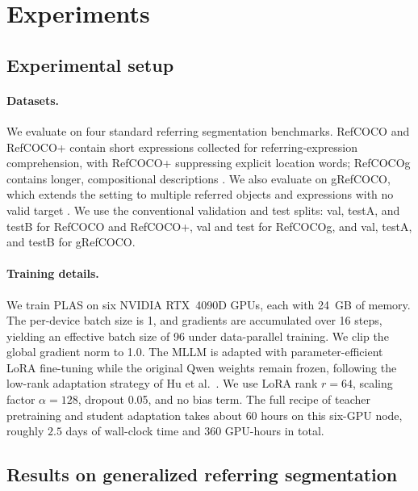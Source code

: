 \section{Experiments}
\label{sec:experiments}

\newcommand{\best}[1]{\textbf{#1}}
\newcommand{\second}[1]{\underline{#1}}

\subsection{Experimental setup}
\label{sec:exp_setup}

\paragraph{Datasets.}
We evaluate on four standard referring segmentation benchmarks. RefCOCO and RefCOCO+ contain short expressions collected for referring-expression comprehension, with RefCOCO+ suppressing explicit location words; RefCOCOg contains longer, compositional descriptions \cite{Yu2016ModelingContext,Mao2016RefCOCOg}. We also evaluate on gRefCOCO, which extends the setting to multiple referred objects and expressions with no valid target \cite{Liu2023GRES}. We use the conventional validation and test splits: val, testA, and testB for RefCOCO and RefCOCO+, val and test for RefCOCOg, and val, testA, and testB for gRefCOCO.


\paragraph{Training details.}
We train PLAS on six NVIDIA RTX~4090D GPUs, each with 24~GB of memory. The per-device batch size is 1, and gradients are accumulated over 16 steps, yielding an effective batch size of 96 under data-parallel training. We clip the global gradient norm to 1.0. The MLLM is adapted with parameter-efficient LoRA fine-tuning while the original Qwen weights remain frozen, following the low-rank adaptation strategy of Hu et al.~\cite{Hu2022LoRA}. We use LoRA rank $r=64$, scaling factor $\alpha=128$, dropout 0.05, and no bias term. The full recipe of teacher pretraining and student adaptation takes about $60$ hours on this six-GPU node, roughly $2.5$ days of wall-clock time and $360$ GPU-hours in total.

\subsection{Results on generalized referring segmentation}
\label{sec:gref_results}

